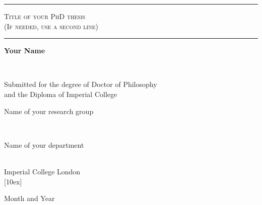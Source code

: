 \begin{titlepage}

\begin{center}
\rule{\linewidth}{1pt}

\textsc{\Large 
Title of your PhD thesis\\[1ex](If needed, use a second line)}

\rule{\linewidth}{1pt}

\vfill

\begin{Large}\textbf{Your Name}\end{Large} \\
[3ex]\begin{large}Submitted for the degree of Doctor of Philosophy\\
[1ex]and the Diploma of Imperial College\end{large}

\vfill
\begin{Large}Name of your research group\end{Large} \\
[2ex]\begin{Large}Name of your department\end{Large} \\
[2ex]{\LARGE Imperial College London}\\
[10ex]

{Month and Year}

\end{center}

\end{titlepage}

%
%
